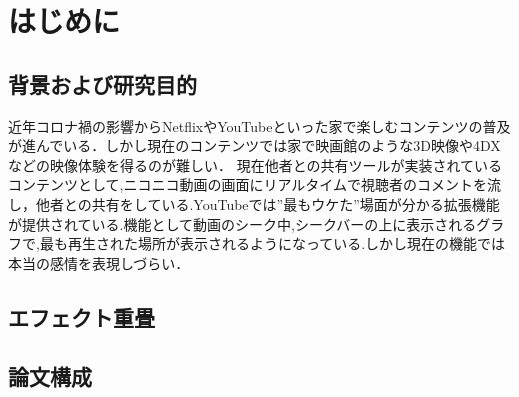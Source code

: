 \chapter{はじめに}
\thispagestyle{myheadings}

\section{背景および研究目的}
近年コロナ禍の影響からNetflixやYouTubeといった家で楽しむコンテンツの普及が進んでいる．しかし現在のコンテンツでは家で映画館のような3D映像や4DXなどの映像体験を得るのが難しい．
現在他者との共有ツールが実装されているコンテンツとして,ニコニコ動画の画面にリアルタイムで視聴者のコメントを流し，他者との共有をしている.YouTubeでは”最もウケた”場面が分かる拡張機能が提供されている.機能として動画のシーク中,シークバーの上に表示されるグラフで,最も再生された場所が表示されるようになっている.しかし現在の機能では本当の感情を表現しづらい．



\section{エフェクト重畳}
\label{sec:example}


\section{論文構成}
